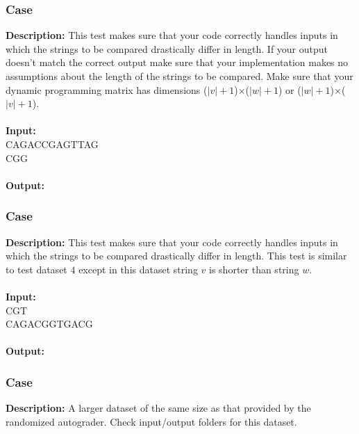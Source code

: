 \documentclass{article}
\newcommand{\code}[1]{{\fontfamily{pcr}\selectfont #1}}
\begin{document}
\subsubsection*{Case }
\hline \vspace{5}
\textbf{Description:} This test makes sure that your code correctly handles inputs in which the strings to be compared drastically differ in length. If your output doesn’t match the correct output make sure that your implementation makes no assumptions about the length of the strings to be compared. Make sure that your dynamic programming matrix has dimensions ($|v|+1$)$\times$($|w|+1$) or ($|w|+1$)$\times$($|v|+1$).\\ \\
\noindent \textbf{Input:}\\
\code{CAGACCGAGTTAG\\CGG}\\ \\
\noindent \textbf{Output:}\\
\code{10}

\subsubsection*{Case }
\hline \vspace{5}
\textbf{Description:} This test makes sure that your code correctly handles inputs in which the strings to be compared drastically differ in length. This test is similar to test dataset $4$ except in this dataset string $v$ is shorter than string $w$.\\ \\
\noindent \textbf{Input:}\\
\code{CGT\\CAGACGGTGACG}\\ \\
\noindent \textbf{Output:}\\
\code{9}
\pagebreak

\subsubsection*{Case }
\hline \vspace{5}
\textbf{Description:} A larger dataset of the same size as that provided by the randomized autograder. Check input/output folders for this dataset.\\ \\
\pagebreak
\end{document}
